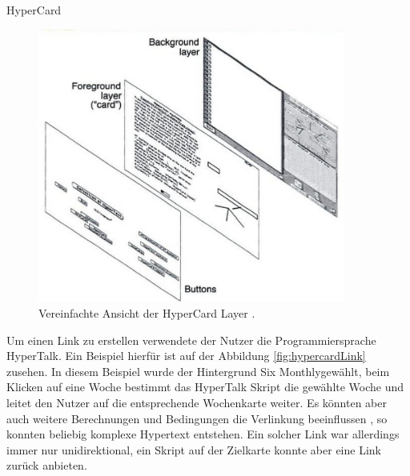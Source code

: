 \begin{section}{HyperCard}
\begin{figure}[H]
	\centering
	\includegraphics[width=0.9\textwidth]{image/layer}
	\caption{Vereinfachte Ansicht der HyperCard Layer \cite{Nielsen1995}.}
	\label{fig:layer}
\end{figure}

Um einen Link zu erstellen verwendete der Nutzer die Programmiersprache HyperTalk. Ein Beispiel hierfür ist auf der Abbildung \ref{fig:hypercardLink} zusehen. In diesem Beispiel wurde der Hintergrund \glqq Six Monthly\grqq{ }gewählt, beim Klicken auf eine Woche bestimmt das HyperTalk Skript die gewählte Woche und leitet den Nutzer auf die entsprechende Wochenkarte weiter. Es könnten aber auch weitere Berechnungen und Bedingungen die Verlinkung beeinflussen \cite{Goodman1988}, so konnten beliebig komplexe Hypertext entstehen. Ein solcher Link war allerdings immer nur unidirektional, ein Skript auf der Zielkarte konnte aber eine Link zurück anbieten.


\end{section}
